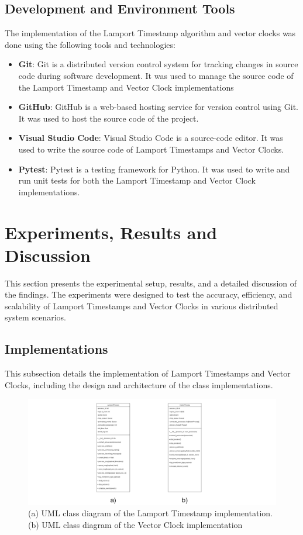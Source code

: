 \documentclass{article}
\begin{document}
  \subsection{Development and Environment Tools}
    The implementation of the Lamport Timestamp algorithm and vector clocks was done using the following tools and technologies:
    \begin{itemize}
        \item \textbf{Git}: Git is a distributed version control system for tracking changes in source code during software development. It was used to manage the source code of the Lamport Timestamp and Vector Clock implementations
        \item \textbf{GitHub}: GitHub is a web-based hosting service for version control using Git. It was used to host the source code of the project.
        \item \textbf{Visual Studio Code}: Visual Studio Code is a source-code editor. It was used to write the source code of Lamport Timestamps and Vector Clocks.
        \item \textbf{Pytest}: Pytest is a testing framework for Python. It was used to write and run unit tests for both the Lamport Timestamp and Vector Clock implementations.
      \end{itemize}

\section{Experiments, Results and Discussion}
  This section presents the experimental setup, results, and a detailed discussion of the findings. The experiments were designed to test the accuracy, efficiency, and scalability of Lamport Timestamps and Vector Clocks in various distributed system scenarios.

  \subsection{Implementations}
    This subsection details the implementation of Lamport Timestamps and Vector Clocks, including the design and architecture of the class implementations.
    
    \begin{figure}[h!]
      \centering
      \includegraphics[width=\textwidth]{img/class_diagram.png}
      \caption{(a) UML class diagram of the Lamport Timestamp implementation. (b) UML class diagram of the Vector Clock implementation}
      \label{fig:class_diagram}

    \end{figure}
\end{document}
